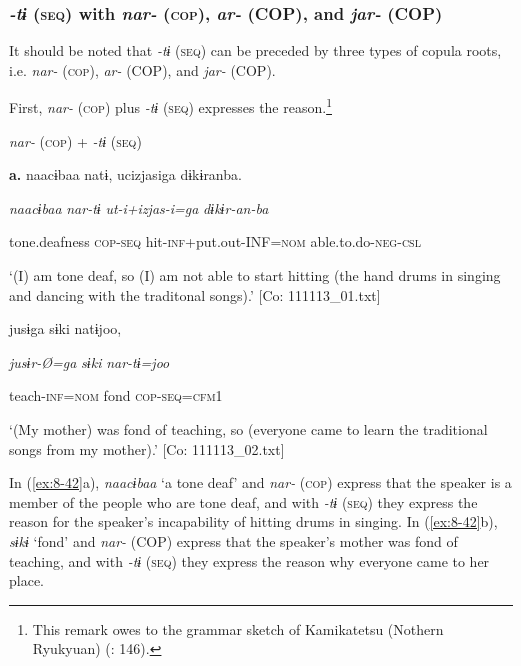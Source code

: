 \subsubsection{\textit{{}-tɨ} (\textsc{seq}) with \textit{nar-} (\textsc{cop}), \textit{ar-} (COP), and \textit{jar-} (COP)}

It should be noted that \textit{{}-tɨ} (\textsc{seq}) can be preceded by three types of copula roots, i.e. \textit{nar-} (\textsc{cop}), \textit{ar-} (COP), and \textit{jar-} (COP).

First, \textit{nar-} (\textsc{cop}) plus \textit{{}-tɨ} (\textsc{seq}) expresses the reason.\footnote{This remark owes to the grammar sketch of Kamikatetsu (Nothern Ryukyuan) (\citealt{ShirataEtAl2011}: 146).}

\textbf{\ea\label{ex:8-42}
}  \textit{nar-} (\textsc{cop}) + \textit{{}-tɨ} (\textsc{seq})

  \textbf{a.}  {\TM}
\glll  naacɨbaa  natɨ,  ucizjasiga  dɨkɨranba.

      \textit{naacɨbaa}  \textit{nar-tɨ}  \textit{ut-i+izjas-i=ga}  \textit{dɨkɨr-an-ba}

      tone.deafness  \textsc{cop}-\textsc{seq}  hit-\textsc{inf}+put.out-INF=\textsc{nom}  able.to.do-\textsc{neg}-\textsc{csl}

\glt ‘(I) am tone deaf, so (I) am not able to start hitting (the hand drums in singing and dancing with the traditonal songs).’ [Co: 111113\_01.txt]
\z

\ex  [= (\ref{ex:4-13}c)]

    {\TM}
\glll  jusɨga  sɨki  natɨjoo,

      \textit{jusɨr-Ø=ga}  \textit{sɨki}  \textit{nar-tɨ=joo}

      teach-\textsc{inf}=\textsc{nom}  fond  \textsc{cop}-\textsc{seq}=\textsc{cfm1}

\glt ‘(My mother) was fond of teaching, so (everyone came to learn the traditional songs from my mother).’ [Co: 111113\_02.txt]
\z

In (\ref{ex:8-42}a), \textit{naacɨbaa} ‘a tone deaf’ and \textit{nar-} (\textsc{cop}) express that the speaker is a member of the people who are tone deaf, and with \textit{{}-tɨ} (\textsc{seq}) they express the reason for the speaker’s incapability of hitting drums in singing. In (\ref{ex:8-42}b), \textit{sɨkɨ} ‘fond’ and \textit{nar-} (COP) express that the speaker’s mother was fond of teaching, and with \textit{{}-tɨ} (\textsc{seq}) they express the reason why everyone came to her place.

